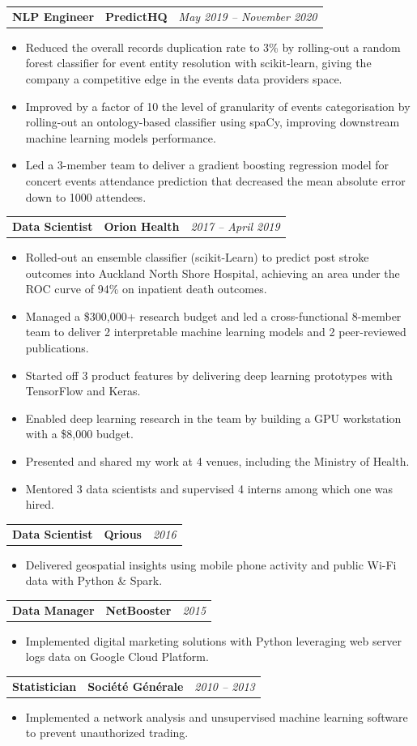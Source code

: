 \documentclass[letterpaper,11pt]{article}
\newcommand{\resumeItemListStart}{\begin{itemize}[label=$\circ$, topsep=0.1cm, parsep=0cm, partopsep=0cm, itemsep=0.1cm, leftmargin=0.4cm]}
\newcommand{\resumeItem}[1]{\item\small{#1}}
\newcommand{\resumeItemListEnd}{\end{itemize}}
\newcommand{\job}[4]{
    \begin{tabular}{p{7cm}p{6cm}p{5cm}}
      \hspace{-0.7em} \textbf{#1} & \textbf{\small{#2}} & \hfill \textit{\small{#4}}
    \end{tabular}
}
\begin{document}
\job {NLP Engineer}{PredictHQ}{Auckland}{May 2019 -- November 2020}
\resumeItemListStart
\resumeItem {Reduced the overall records duplication rate to 3\% by rolling-out a random forest classifier for event entity resolution with scikit-learn, giving the company a competitive edge in the events data providers space.}
\resumeItem {Improved by a factor of 10 the level of granularity of events categorisation by rolling-out an ontology-based classifier using spaCy, improving downstream machine learning models performance.}
\resumeItem {Led a 3-member team to deliver a gradient boosting regression model for concert events attendance prediction that decreased the mean absolute error down to 1000 attendees.}
\resumeItemListEnd \vspace{0.2cm}
	
\job {Data Scientist}{Orion Health}{Auckland}{2017 -- April 2019}
\resumeItemListStart
\resumeItem {Rolled-out an ensemble classifier (scikit-Learn) to predict post stroke outcomes into Auckland North Shore Hospital, achieving an area under the ROC curve of 94\% on inpatient death outcomes.}
\resumeItem {Managed a \$300,000+ research budget and led a cross-functional 8-member team to deliver 2 interpretable machine learning models and 2 peer-reviewed publications.}
\resumeItem {Started off 3 product features by delivering deep learning prototypes with TensorFlow and Keras.}
\resumeItem {Enabled deep learning research in the team by building a GPU workstation with a \$8,000 budget.}
\resumeItem {Presented and shared my work at 4 venues, including the Ministry of Health.}
\resumeItem {Mentored 3 data scientists and supervised 4 interns among which one was hired.}
\resumeItemListEnd \vspace{0.2cm}

\job {Data Scientist}{Qrious}{Auckland}{2016}
\resumeItemListStart
\resumeItem {Delivered geospatial insights using mobile phone activity and public Wi-Fi data with Python \& Spark.}
\resumeItemListEnd \vspace{0.2cm}

\job {Data Manager}{NetBooster}{Paris}{2015}
\resumeItemListStart
\resumeItem {Implemented digital marketing solutions with Python leveraging web server logs data on Google Cloud Platform.}
\resumeItemListEnd \vspace{0.2cm}

\job {Statistician}{Société Générale}{Paris}{2010 -- 2013}
\resumeItemListStart
\resumeItem {Implemented a network analysis and unsupervised machine learning software to prevent unauthorized trading.}
\resumeItemListEnd 
\end{document}
